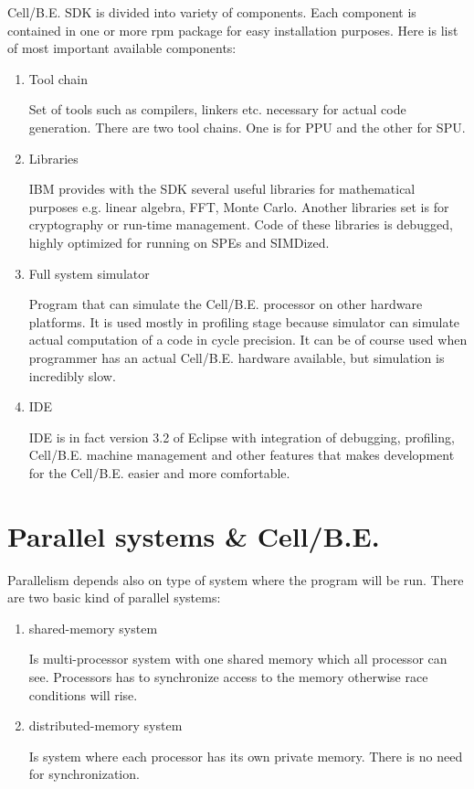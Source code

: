 Cell/B.E. SDK is divided into variety of components.
Each component is contained in one or more rpm package for easy installation purposes.
Here is list of most important available components:
\begin{enumerate}
  \item {Tool chain}
  \par
  Set of tools such as compilers, linkers etc. necessary for actual code generation.
There are two tool chains.
One is for PPU and the other for SPU.

  \item {Libraries}
  \par
  IBM provides with the SDK several useful libraries for mathematical purposes e.g. linear algebra, FFT, Monte Carlo.
Another libraries set is for cryptography or run-time management.
Code of these libraries is debugged, highly optimized for running on SPEs and SIMDized.

  \item {Full system simulator}
  \par
  Program that can simulate the Cell/B.E. processor on other hardware platforms.
It is used mostly in profiling stage because simulator can simulate actual computation of a code in cycle precision.
It can be of course used when programmer has an actual Cell/B.E. hardware available, but simulation is incredibly slow.

  \item {IDE}
  \par
  IDE is in fact version 3.2 of Eclipse with integration of debugging, profiling, Cell/B.E. machine management and other features that makes development for the Cell/B.E. easier and more comfortable.
\end{enumerate}


\section{Parallel systems \& Cell/B.E.}

Parallelism depends also on type of system where the program will be run.
There are two basic kind of parallel systems:
\begin{enumerate}
\item {shared-memory system}
\par
Is multi-processor system with one shared memory which all processor can see.
Processors has to synchronize access to the memory otherwise race conditions will rise.

\item {distributed-memory system}
\par
Is system where each processor has its own private memory.
There is no need for synchronization.
\end{enumerate}

